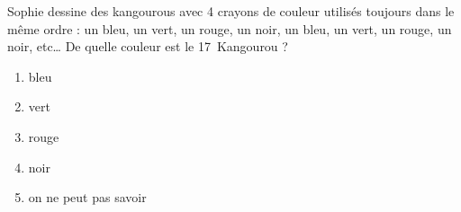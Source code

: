 Sophie dessine des kangourous avec 4 crayons de couleur utilisés toujours dans le même
ordre : un bleu, un vert, un rouge, un noir, un bleu, un vert, un rouge, un noir, etc\ldots
De quelle couleur est le 17\ieme\ Kangourou ?
\begin{multicols}{5}
\begin{enumerate}[A/]
\item bleu
\item vert
\item rouge
\item noir
\item on ne peut pas savoir
\end{enumerate}
\end{multicols}
